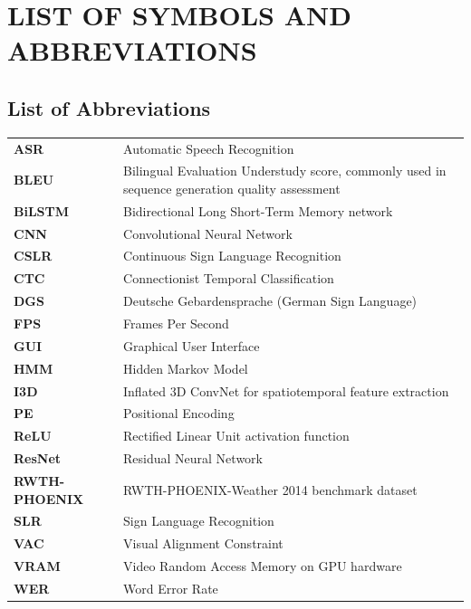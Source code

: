 \chapter*{LIST OF SYMBOLS AND ABBREVIATIONS}

\section*{List of Abbreviations}
\begin{tabularx}{\textwidth}{@{}p{}X@{}}
\textbf{ASR} & Automatic Speech Recognition \\
\textbf{BLEU} & Bilingual Evaluation Understudy score, commonly used in sequence generation quality assessment \\
\textbf{BiLSTM} & Bidirectional Long Short-Term Memory network \\
\textbf{CNN} & Convolutional Neural Network \\
\textbf{CSLR} & Continuous Sign Language Recognition \\
\textbf{CTC} & Connectionist Temporal Classification \\
\textbf{DGS} & Deutsche Gebardensprache (German Sign Language) \\
\textbf{FPS} & Frames Per Second \\
\textbf{GUI} & Graphical User Interface \\
\textbf{HMM} & Hidden Markov Model \\
\textbf{I3D} & Inflated 3D ConvNet for spatiotemporal feature extraction \\
\textbf{PE} & Positional Encoding \\
\textbf{ReLU} & Rectified Linear Unit activation function \\
\textbf{ResNet} & Residual Neural Network \\
\textbf{RWTH-PHOENIX} & RWTH-PHOENIX-Weather 2014 benchmark dataset \\
\textbf{SLR} & Sign Language Recognition \\
\textbf{VAC} & Visual Alignment Constraint \\
\textbf{VRAM} & Video Random Access Memory on GPU hardware \\
\textbf{WER} & Word Error Rate \\
\end{tabularx}

\vspace{0.75cm}

